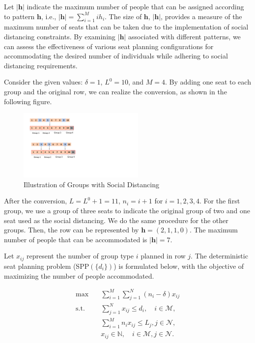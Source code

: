 Let $|\bm{h}|$ indicate the maximum number of people that can be assigned according to pattern $\bm{h}$, i.e., $|\bm{h}| = \sum_{i =1}^{M} i h_i$. The size of $\bm{h}$, $|\bm{h}|$, provides a measure of the maximum number of seats that can be taken due to the implementation of social distancing constraints. By examining $|\bm{h}|$ associated with different patterns, we can assess the effectiveness of various seat planning configurations for accommodating the desired number of individuals while adhering to social distancing requirements.

\begin{example}
Consider the given values: $\delta = 1$, $L^{0} = 10$, and $M = 4$. By adding one seat to each group and the original row, we can realize the conversion, as shown in the following figure.

\begin{figure}[ht]
    \centering
        \includegraphics[width=0.55\textwidth]{./Figures/illustration.pdf}
    \caption{Illustration of Groups with Social Distancing}
\end{figure}

After the conversion, $L = L^{0} + 1 =11$, $n_i = i + 1$ for $i = 1, 2, 3, 4$. For the first group, we use a group of three seats to indicate the original group of two and one seat used as the social distancing. We do the same procedure for the other groups. Then, the row can be represented by $\bm{h} = (2,1,1,0)$. The maximum number of people that can be accommodated is $|\bm{h}| = 7$.
\end{example}


Let $x_{ij}$ represent the number of group type $i$ planned in row $j$. The deterministic seat planning problem (SPP$(\{d_{i}\})$) is formulated below, with the objective of maximizing the number of people accommodated.

\begin{equation}\label{deter_upper}
    \begin{aligned}
    \max \quad & \sum_{i=1}^{M}  \sum_{j= 1}^{N} (n_i- \delta) x_{ij} \\
    \text {s.t.} \quad & \sum_{j= 1}^{N} x_{ij} \leq d_{i}, \quad i \in \mathcal{M}, \\
    & \sum_{i=1}^{M} n_{i} x_{ij} \leq L_j, j \in \mathcal{N}, \\
    & x_{ij} \in \mathbb{N}, \quad i \in \mathcal{M}, j \in \mathcal{N}.
    \end{aligned}
\end{equation}
  
